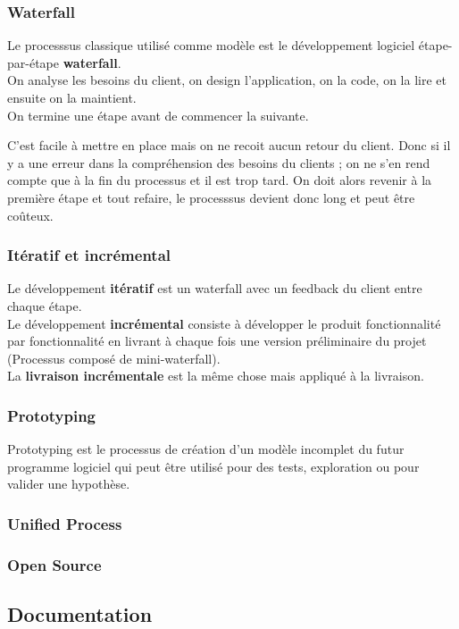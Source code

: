 \subsubsection{Waterfall}
Le processsus classique utilisé comme modèle est le développement logiciel étape-par-étape \textbf{waterfall}.\\
On analyse les besoins du client, on design l'application, on la code, on la lire et ensuite on la maintient.\\
On termine une étape avant de commencer la suivante.

C'est facile à mettre en place mais on ne recoit aucun retour du client. Donc si il y a une erreur dans la compréhension des besoins du clients ; on ne s'en rend compte que à la fin du processus et il est trop tard. On doit alors revenir à la première étape et tout refaire, le processsus devient donc long et peut être coûteux.



\subsubsection{Itératif et incrémental}
Le développement \textbf{itératif} est un waterfall avec un feedback du client entre chaque étape.\\
Le développement \textbf{incrémental} consiste à développer le produit fonctionnalité par fonctionnalité en livrant à chaque fois une version préliminaire du projet (Processus composé de mini-waterfall).\\
La \textbf{livraison incrémentale} est la même chose mais appliqué à la livraison.



\subsubsection{Prototyping}
Prototyping est le processus de création d'un modèle incomplet du futur programme logiciel qui peut être utilisé pour des tests, exploration ou pour valider une hypothèse.


\subsubsection{Unified Process}



\subsubsection{Open Source}



\subsection{Documentation}
